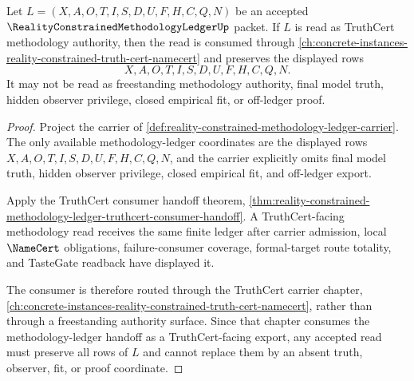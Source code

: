 \begin{theorem}
\label{thm:reality-constrained-methodology-ledger-truthcert-reverse-dependency}
Let $L=(X,A,O,T,I,S,D,U,F,H,C,Q,N)$ be an accepted $\RealityConstrainedMethodologyLedgerUp$ packet. If $L$ is read as TruthCert methodology authority, then the read is consumed through \autoref{ch:concrete-instances-reality-constrained-truth-cert-namecert} and preserves the displayed rows
$$
X,A,O,T,I,S,D,U,F,H,C,Q,N.
$$
It may not be read as freestanding methodology authority, final model truth, hidden observer privilege, closed empirical fit, or off-ledger proof.
\end{theorem}
\begin{proof}
Project the carrier of \autoref{def:reality-constrained-methodology-ledger-carrier}. The only available methodology-ledger coordinates are the displayed rows $X,A,O,T,I,S,D,U,F,H,C,Q,N$, and the carrier explicitly omits final model truth, hidden observer privilege, closed empirical fit, and off-ledger export.

Apply the TruthCert consumer handoff theorem, \autoref{thm:reality-constrained-methodology-ledger-truthcert-consumer-handoff}. A TruthCert-facing methodology read receives the same finite ledger after carrier admission, local $\NameCert$ obligations, failure-consumer coverage, formal-target route totality, and TasteGate readback have displayed it.

The consumer is therefore routed through the TruthCert carrier chapter, \autoref{ch:concrete-instances-reality-constrained-truth-cert-namecert}, rather than through a freestanding authority surface. Since that chapter consumes the methodology-ledger handoff as a TruthCert-facing export, any accepted read must preserve all rows of $L$ and cannot replace them by an absent truth, observer, fit, or proof coordinate.
\end{proof}
